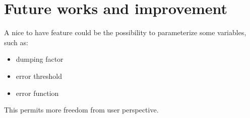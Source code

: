 \documentclass[10pt]{article}
\begin{document}
\section{Future works and improvement}

A nice to have feature could be the possibility to parameterize some variables, such as:
\begin{itemize}
    \item dumping factor
    \item error threshold
    \item error function
\end{itemize}
This permits more freedom from user perspective.
\newpage

 
\end{document}

